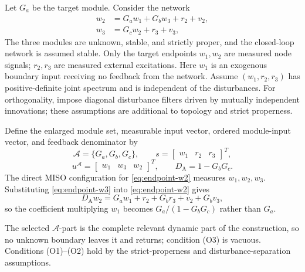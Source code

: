\documentclass[11pt,a4paper]{article}
\newcommand{\Aset}{\mathcal A}
\begin{document}
Let $G_a$ be the target module.  Consider the network
\begin{align}
  w_2 &= G_a w_1+G_b w_3+r_2+v_2,
  \label{eq:endpoint-w2}\\
  w_3 &= G_c w_2+r_3+v_3,
  \label{eq:endpoint-w3}
\end{align}
The three modules are unknown, stable, and strictly proper, and the closed-loop network is assumed stable.  Only the target endpoints $w_1,w_2$ are measured node signals; $r_2,r_3$ are measured external excitations.  Here $w_1$ is an exogenous boundary input receiving no feedback from the network.  Assume $(w_1,r_2,r_3)$ has positive-definite joint spectrum and is independent of the disturbances.  For orthogonality, impose diagonal disturbance filters driven by mutually independent innovations; these assumptions are additional to topology and strict properness.

Define the enlarged module set, measurable input vector, ordered module-input vector, and feedback denominator by
\[
  \Aset=\{G_a,G_b,G_c\},
  \qquad
  s=\begin{bmatrix}w_1&r_2&r_3\end{bmatrix}^{\!T},
\]
\[
  u^{\Aset}=\begin{bmatrix}w_1&w_3&w_2\end{bmatrix}^{\!T},
  \qquad D_{\mathrm A}=1-G_bG_c.
\]
The direct MISO configuration for \eqref{eq:endpoint-w2} measures $w_1,w_2,w_3$.  Substituting \eqref{eq:endpoint-w3} into \eqref{eq:endpoint-w2} gives
\begin{equation}
  D_{\mathrm A}w_2=G_aw_1+r_2+G_br_3+v_2+G_bv_3,
  \label{eq:endpoint-immersed}
\end{equation}
so the coefficient multiplying $w_1$ becomes $G_a/(1-G_bG_c)$ rather than $G_a$.

The selected $\Aset$-part is the complete relevant dynamic part of the construction, so no unknown boundary leaves it and returns; condition (O3) is vacuous.  Conditions (O1)--(O2) hold by the strict-properness and disturbance-separation assumptions.
\end{document}
